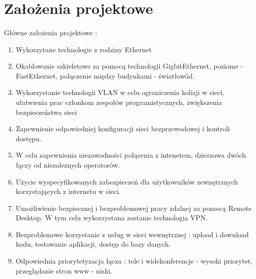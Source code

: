\section{Założenia projektowe}
\paragraph{}
Główne założenia projektowe :
\begin{enumerate}
	\item Wykorzytane technologie z rodziny Ethernet
	\item Okablowanie szkieletowe za pomocą technologii GigbitEthernet, poziome - FastEthernet, połączenie między budynkami - światłowód.
	\item Wykorzystanie technologii VLAN w celu ograniczenia kolizji  w sieci, ułatwienia prac członkom zespołów programistycznych, zwiększenia bezpieczeństwa sieci
	\item Zapewnienie odpowiedniej konfiguracji sieci bezprzewodowej i kontroli dostępu.
	\item W celu zapewnienia niezawodności połącenia z intenetem, dzierzawa dwóch łączy od niezaleznych operatorów.
	\item Użycie wyspecyfikowanych zabezpieczeń dla użytkowników zewnętrznych korzystających z internetu w sieci.
	\item Umożliwienie bezpiecznej i bezproblemowej pracy zdalnej za pomocą Remote Desktop. W tym celu wykorzystana zostanie technologia VPN.
	\item Bezproblemowe korzystanie z usług w sieci wewnętrznej : upload i download kodu, testowanie aplikacji, dostęp do bazy danych.
	\item Odpowiednia priorytetyzacja łącza : tele i widekonferencje - wysoki priorytet, przeglądanie stron www - niski.
\end{enumerate}